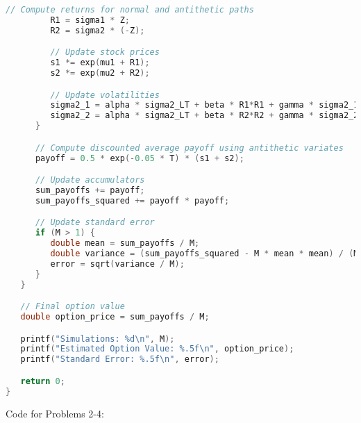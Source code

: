 \documentclass{report}
\begin{document}
\begin{lstlisting}[language=C++]
         // Compute returns for normal and antithetic paths
         R1 = sigma1 * Z;
         R2 = sigma2 * (-Z);

         // Update stock prices
         s1 *= exp(mu1 + R1);
         s2 *= exp(mu2 + R2);

         // Update volatilities
         sigma2_1 = alpha * sigma2_LT + beta * R1*R1 + gamma * sigma2_1;
         sigma2_2 = alpha * sigma2_LT + beta * R2*R2 + gamma * sigma2_2;
      }

      // Compute discounted average payoff using antithetic variates
      payoff = 0.5 * exp(-0.05 * T) * (s1 + s2);

      // Update accumulators
      sum_payoffs += payoff;
      sum_payoffs_squared += payoff * payoff;

      // Update standard error 
      if (M > 1) {
         double mean = sum_payoffs / M;
         double variance = (sum_payoffs_squared - M * mean * mean) / (M-1);
         error = sqrt(variance / M);
      }
   }

   // Final option value
   double option_price = sum_payoffs / M;

   printf("Simulations: %d\n", M);
   printf("Estimated Option Value: %.5f\n", option_price);
   printf("Standard Error: %.5f\n", error);

   return 0;
}
\end{lstlisting}
\newpage
Code for Problems 2-4:
\end{document}
